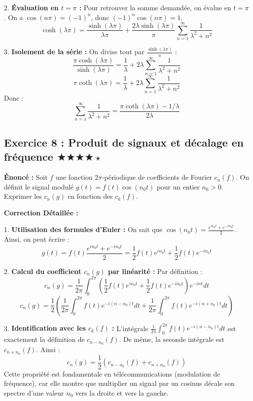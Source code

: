 \documentclass[11pt,a4paper]{article}
\begin{document}
2. \textbf{Évaluation en $t=\pi$ :}
   Pour retrouver la somme demandée, on évalue en $t=\pi$. On a $\cos(n\pi) = (-1)^n$, donc $(-1)^n \cos(n\pi) = 1$.
   $$ \cosh(\lambda\pi) = \frac{\sinh(\lambda\pi)}{\lambda\pi} + \frac{2\lambda\sinh(\lambda\pi)}{\pi} \sum_{n=1}^\infty \frac{1}{\lambda^2 + n^2} $$

3. \textbf{Isolement de la série :}
   On divise tout par $\frac{\sinh(\lambda\pi)}{\pi}$ :
   $$ \frac{\pi \cosh(\lambda\pi)}{\sinh(\lambda\pi)} = \frac{1}{\lambda} + 2\lambda \sum_{n=1}^\infty \frac{1}{\lambda^2 + n^2} $$
   $$ \pi \coth(\lambda\pi) = \frac{1}{\lambda} + 2\lambda \sum_{n=1}^\infty \frac{1}{\lambda^2 + n^2} $$
   Donc :
   $$ \sum_{n=1}^\infty \frac{1}{\lambda^2 + n^2} = \frac{\pi \coth(\lambda\pi) - 1/\lambda}{2\lambda} $$


\subsection*{Exercice 8 : Produit de signaux et décalage en fréquence \quad $\bigstar\bigstar\bigstar\bigstar\star$}

\textbf{Énoncé :}
Soit $f$ une fonction $2\pi$-périodique de coefficients de Fourier $c_n(f)$. On définit le signal modulé $g(t) = f(t) \cos(n_0 t)$ pour un entier $n_0 > 0$. Exprimer les $c_n(g)$ en fonction des $c_k(f)$.

\textbf{Correction Détaillée :}

1. \textbf{Utilisation des formules d'Euler :}
   On sait que $\cos(n_0 t) = \frac{e^{in_0 t} + e^{-in_0 t}}{2}$.
   Ainsi, on peut écrire :
   $$ g(t) = f(t) \frac{e^{in_0 t} + e^{-in_0 t}}{2} = \frac{1}{2} f(t)e^{in_0 t} + \frac{1}{2} f(t)e^{-in_0 t} $$

2. \textbf{Calcul du coefficient $c_n(g)$ par linéarité :}
   Par définition :
   $$ c_n(g) = \frac{1}{2\pi} \int_0^{2\pi} \left( \frac{1}{2} f(t)e^{in_0 t} + \frac{1}{2} f(t)e^{-in_0 t} \right) e^{-int} dt $$
   $$ c_n(g) = \frac{1}{2} \left( \frac{1}{2\pi} \int_0^{2\pi} f(t) e^{-i(n-n_0)t} dt + \frac{1}{2\pi} \int_0^{2\pi} f(t) e^{-i(n+n_0)t} dt \right) $$

3. \textbf{Identification avec les $c_k(f)$ :}
   L'intégrale $\frac{1}{2\pi} \int_0^{2\pi} f(t) e^{-i(n-n_0)t} dt$ est exactement la définition de $c_{n-n_0}(f)$.
   De même, la seconde intégrale est $c_{n+n_0}(f)$.
   Ainsi :
   $$ c_n(g) = \frac{1}{2} (c_{n-n_0}(f) + c_{n+n_0}(f)) $$
   Cette propriété est fondamentale en télécommunications (modulation de fréquence), car elle montre que multiplier un signal par un cosinus décale son spectre d'une valeur $n_0$ vers la droite et vers la gauche.
\end{document}
